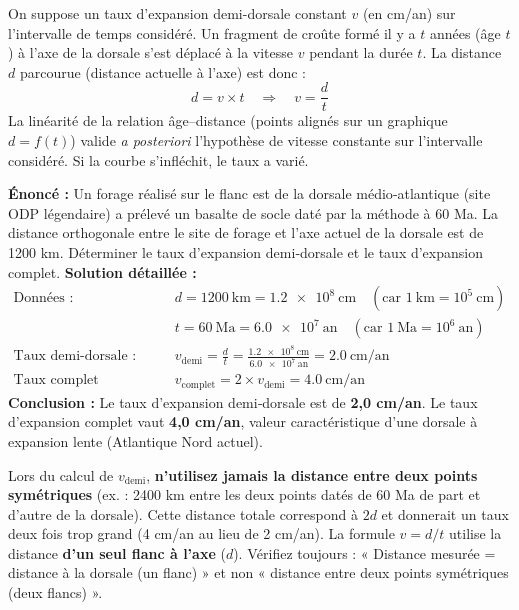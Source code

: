 \documentclass[11pt]{article}
\begin{document}
\begin{propriete}[Démonstration guidée de la relation $v = d/t$]
On suppose un taux d'expansion demi-dorsale constant $v$ (en cm/an) sur l'intervalle de temps considéré. Un fragment de croûte formé il y a $t$ années (âge $t$) à l'axe de la dorsale s'est déplacé à la vitesse $v$ pendant la durée $t$. La distance $d$ parcourue (distance actuelle à l'axe) est donc :
\[ d = v \times t \quad \Rightarrow \quad v = \frac{d}{t} \]
La linéarité de la relation âge–distance (points alignés sur un graphique $d = f(t)$) valide \emph{a posteriori} l'hypothèse de vitesse constante sur l'intervalle considéré. Si la courbe s'infléchit, le taux a varié.
\end{propriete}

\begin{exoresolu}
\textbf{Énoncé :} Un forage réalisé sur le flanc est de la dorsale médio‑atlantique (site ODP légendaire) a prélevé un basalte de socle daté par la méthode  à \num{60} Ma. La distance orthogonale entre le site de forage et l'axe actuel de la dorsale est de \num{1200} km. Déterminer le taux d'expansion demi‑dorsale et le taux d'expansion complet.
\tcblower
\textbf{Solution détaillée :}
\begin{align*}
\text{Données :} \quad & d = \num{1200}\ \text{km} = \num{1,2e8}\ \text{cm} \quad (\text{car } 1\ \text{km} = 10^5\ \text{cm}) \\
& t = \num{60}\ \text{Ma} = \num{6,0e7}\ \text{an} \quad (\text{car } 1\ \text{Ma} = 10^6\ \text{an}) \\[0.5em]
\text{Taux demi-dorsale :} \quad & v_{\text{demi}} = \frac{d}{t} = \frac{\num{1,2e8}\ \text{cm}}{\num{6,0e7}\ \text{an}} = \num{2,0}\ \text{cm/an} \\[0.5em]
\text{Taux complet (séparation des deux plaques) :} \quad & v_{\text{complet}} = 2 \times v_{\text{demi}} = \num{4,0}\ \text{cm/an}
\end{align*}
\textbf{Conclusion :} Le taux d'expansion demi‑dorsale est de \textbf{2,0 cm/an}. Le taux d'expansion complet vaut \textbf{4,0 cm/an}, valeur caractéristique d'une dorsale à expansion lente (Atlantique Nord actuel).
\end{exoresolu}

\begin{attention}
Lors du calcul de $v_{\text{demi}}$, \textbf{n'utilisez jamais la distance entre deux points symétriques} (ex. : \num{2400} km entre les deux points datés de 60 Ma de part et d'autre de la dorsale). Cette distance totale correspond à $2d$ et donnerait un taux deux fois trop grand (\num{4} cm/an au lieu de \num{2} cm/an). La formule $v = d/t$ utilise la distance \textbf{d'un seul flanc à l'axe} ($d$). Vérifiez toujours : « Distance mesurée = distance à la dorsale (un flanc) » et non « distance entre deux points symétriques (deux flancs) ».
\end{attention}
\end{document}
